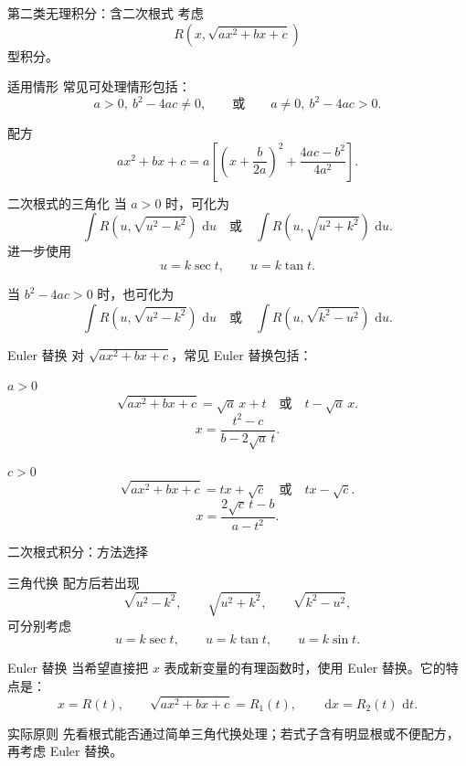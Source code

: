 \documentclass[aspectratio=169,10pt]{ctexbeamer}
\newcommand{\dd}{\,\mathrm{d}}
\begin{document}
\begin{frame}[t]{第二类无理积分：含二次根式}
\small
考虑
\[
  R(x,\sqrt{ax^2+bx+c})
\]
型积分。

\begin{block}{适用情形}
常见可处理情形包括：
\[
  a>0,\ b^2-4ac\ne0,
  \qquad\text{或}\qquad
  a\ne0,\ b^2-4ac>0.
\]
\end{block}

\begin{block}{配方}
\[
  ax^2+bx+c
  =a\left[\left(x+\frac b{2a}\right)^2+\frac{4ac-b^2}{4a^2}\right].
\]
\end{block}
\end{frame}

\begin{frame}[t]{二次根式的三角化}
\small
当 $a>0$ 时，可化为
\[
  \int R(u,\sqrt{u^2-k^2})\,\dd u
  \quad\text{或}\quad
  \int R(u,\sqrt{u^2+k^2})\,\dd u.
\]
进一步使用
\[
  u=k\sec t,\qquad u=k\tan t.
\]

当 $b^2-4ac>0$ 时，也可化为
\[
  \int R(u,\sqrt{u^2-k^2})\,\dd u
  \quad\text{或}\quad
  \int R(u,\sqrt{k^2-u^2})\,\dd u.
\]
\end{frame}

\begin{frame}[t]{Euler 替换}
\small
对 $\sqrt{ax^2+bx+c}$，常见 Euler 替换包括：

\begin{block}{$a>0$}
\[
  \sqrt{ax^2+bx+c}=\sqrt a\,x+t
  \quad\text{或}\quad
  t-\sqrt a\,x.
\]
\[
  x=\frac{t^2-c}{b-2\sqrt a\,t}.
\]
\end{block}

\begin{block}{$c>0$}
\[
  \sqrt{ax^2+bx+c}=tx+\sqrt c
  \quad\text{或}\quad
  tx-\sqrt c.
\]
\[
  x=\frac{2\sqrt c\,t-b}{a-t^2}.
\]
\end{block}
\end{frame}

\begin{frame}[t]{二次根式积分：方法选择}
\small
\begin{block}{三角代换}
配方后若出现
\[
\sqrt{u^2-k^2},\qquad \sqrt{u^2+k^2},\qquad \sqrt{k^2-u^2},
\]
可分别考虑
\[
  u=k\sec t,\qquad u=k\tan t,\qquad u=k\sin t.
\]
\end{block}

\begin{block}{Euler 替换}
当希望直接把 $x$ 表成新变量的有理函数时，使用 Euler 替换。它的特点是：
\[
  x=R(t),\qquad \sqrt{ax^2+bx+c}=R_1(t),\qquad \dd x=R_2(t)\,\dd t.
\]
\end{block}

\begin{alertblock}{实际原则}
先看根式能否通过简单三角代换处理；若式子含有明显根或不便配方，再考虑 Euler 替换。
\end{alertblock}
\end{frame}
\end{document}
